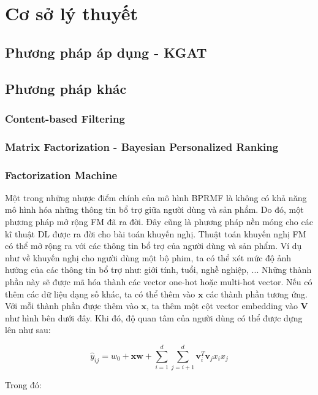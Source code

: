 \section{Cơ sở lý thuyết}
\subsection{Phương pháp áp dụng - KGAT}
\subsection{Phương pháp khác}
\subsubsection{Content-based Filtering}
\subsubsection{Matrix Factorization - Bayesian Personalized Ranking}
\subsubsection{Factorization Machine}
Một trong những nhược điểm chính của mô hình BPRMF là không có khả năng mô hình hóa 
những thông tin bổ trợ giữa người dùng và sản phẩm. Do đó, một phương pháp mở rộng FM đã ra đời. 
Đây cũng là phương pháp nền móng cho các kĩ thuật DL được ra đời cho bài toán khuyến nghị.
\newline
\indent Thuật toán khuyến nghị FM có thể mở rộng ra với các thông tin bổ trợ của người dùng và sản phẩm. 
Ví dụ như về khuyến nghị cho người dùng một bộ phim, ta có thể xét mức độ ảnh hưởng của 
các thông tin bổ trợ như: giới tính, tuổi, nghề nghiệp, ... Những thành phần này sẽ được mã hóa 
thành các vector one-hot hoặc multi-hot vector. Nếu có thêm các dữ liệu dạng số khác, 
ta có thể thêm vào $\mathbf{x}$ các thành phần tương ứng. Với mỗi thành phần được thêm vào 
$\mathbf{x}$, ta thêm một cột vector embedding vào $\mathbf{V}$ như hình bên dưới đây.
Khi đó, độ quan tâm của người dùng có thể được dựng lên như sau:

$$\hat{y}_{ij} = w_0 + \mathbf{xw} + \sum_{i=1}^{d}\sum_{j=i+1}^{d} \mathbf{v}_i^T\mathbf{v}_jx_ix_j$$

Trong đó:

